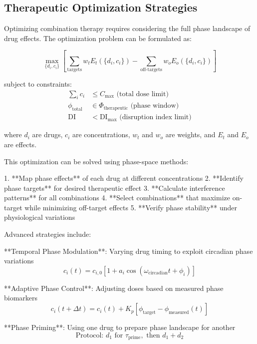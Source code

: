 \documentclass[12pt,a4paper]{report}
\begin{document}
\subsection{Therapeutic Optimization Strategies}

Optimizing combination therapy requires considering the full phase landscape of drug effects. The optimization problem can be formulated as:

\begin{equation}
\max_{\{d_i, c_i\}} \left[ \sum_{\text{targets}} w_t E_t(\{d_i, c_i\}) - \sum_{\text{off-targets}} w_o E_o(\{d_i, c_i\}) \right]
\end{equation}

subject to constraints:
\begin{align}
\sum_i c_i &\leq C_{\text{max}} \text{ (total dose limit)} \\
\phi_{\text{total}} &\in \Phi_{\text{therapeutic}} \text{ (phase window)} \\
\text{DI} &< \text{DI}_{\text{max}} \text{ (disruption index limit)}
\end{align}

where $d_i$ are drugs, $c_i$ are concentrations, $w_t$ and $w_o$ are weights, and $E_t$ and $E_o$ are effects.

This optimization can be solved using phase-space methods:

1. **Map phase effects** of each drug at different concentrations
2. **Identify phase targets** for desired therapeutic effect
3. **Calculate interference patterns** for all combinations
4. **Select combinations** that maximize on-target while minimizing off-target effects
5. **Verify phase stability** under physiological variations

Advanced strategies include:

**Temporal Phase Modulation**: Varying drug timing to exploit circadian phase variations
\begin{equation}
c_i(t) = c_{i,0} \left[1 + a_i \cos(\omega_{\text{circadian}} t + \phi_i)\right]
\end{equation}

**Adaptive Phase Control**: Adjusting doses based on measured phase biomarkers
\begin{equation}
c_i(t+\Delta t) = c_i(t) + K_p[\phi_{\text{target}} - \phi_{\text{measured}}(t)]
\end{equation}

**Phase Priming**: Using one drug to prepare phase landscape for another
\begin{equation}
\text{Protocol: } d_1 \text{ for } \tau_{\text{prime}}, \text{ then } d_1 + d_2
\end{equation}
\end{document}
